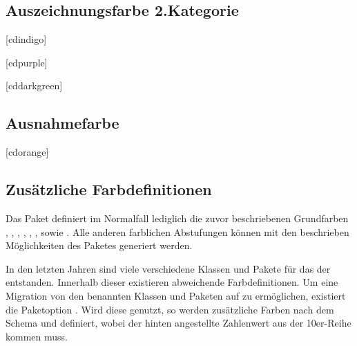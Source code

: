 \begin{Declaration*}{}
\subsection{Auszeichnungsfarbe 2.Kategorie}
\begin{Declaration}{[cdindigo]}
\begin{Declaration}{[cdpurple]}
\begin{Declaration}{[cddarkgreen]}
\end{Declaration}
\end{Declaration}
\end{Declaration}


\subsection{Ausnahmefarbe}
\begin{Declaration}{[cdorange]}
\printdeclarationlist%
\end{Declaration}


\subsection{Zusätzliche Farbdefinitionen}
Das Paket  definiert im Normalfall lediglich die zuvor 
beschriebenen Grundfarben , , , 
, , ,  sowie 
. Alle anderen farblichen Abstufungen können mit den beschrieben 
Möglichkeiten des Paketes  generiert werden.

\begin{Declaration}{}
\printdeclarationlist%
%
In den letzten Jahren sind viele verschiedene Klassen und Pakete für das \CD 
der \TnUD entstanden. Innerhalb dieser existieren abweichende Farbdefinitionen. 
Um eine Migration von den benannten Klassen und Paketen auf \TUDScript zu 
ermöglichen, existiert die Paketoption . Wird diese genutzt, 
so werden zusätzliche Farben nach dem Schema  und 
 definiert, wobei der hinten angestellte Zahlenwert 
aus der 10er-Reihe kommen muss.
\end{Declaration}




\end{Declaration*}
